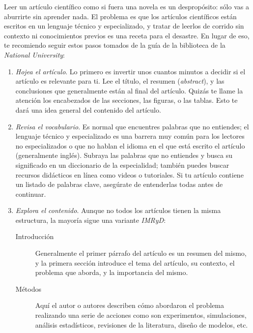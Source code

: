 Leer un artículo científico como si fuera una novela es un despropósito: sólo
vas a aburrirte sin aprender nada.
El problema es que los artículos científicos están escritos en un lenguaje
técnico y especializado, y tratar de leerlos de corrido sin contexto ni
conocimientos previos es una receta para el desastre.
En lugar de eso, te recomiendo seguir estos pasos tomados de la guía de la
biblioteca de la \emph{National University}\cite{NationalUniversity2024}:

\begin{enumerate}
    \item \emph{Hojea el artículo}. Lo primero es invertir unos cuantos minutos
          a decidir si el artículo es relevante para ti.
          Lee el título, el resumen (\emph{abstract}), y las conclusiones que
          generalmente están al final del artículo.
          Quizás te llame la atención los encabezados de las secciones, las
          figuras, o las tablas.
          Esto te dará una idea general del contenido del artículo.
    \item \emph{Revisa el vocabulario}. Es normal que encuentres palabras que no
          entiendes; el lenguaje técnico y especializado es una barrera muy común
          para los lectores no especializados o que no hablan el idioma en el que
          está escrito el artículo (generalmente inglés).
          Subraya las palabras que no entiendes y busca su significado en un
          diccionario de la especialidad; también puedes buscar recursos
          didácticos en línea como videos o tutoriales.
          Si tu artículo contiene un listado de palabras clave, asegúrate de
          entenderlas todas antes de continuar.
    \item \emph{Explora el contenido}. Aunque no todos los artículos tienen la
          misma estructura, la mayoría sigue una variante \emph{IMRyD}:
          \begin{description}
              \item[Introducción] Generalmente el primer párrafo del artículo es
                  un resumen del mismo, y la primera sección introduce el tema
                  del artículo, su contexto, el problema que aborda, y la
                  importancia del mismo.
              \item[Métodos] Aquí el autor o autores describen cómo abordaron el
                  problema realizando una serie de acciones como son
                  experimentos, simulaciones, análisis estadísticos, revisiones
                  de la literatura, diseño de modelos, etc.

\end{description}
\end{enumerate}
